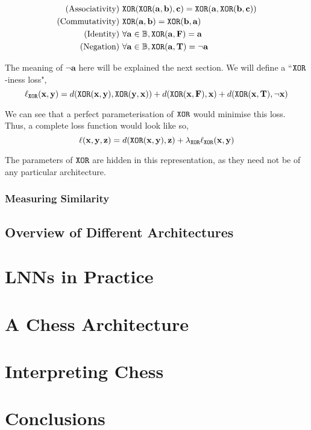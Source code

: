 \documentclass[conference]{report}
\begin{document}
$$
\begin{aligned}
\text{(Associativity)}&\ \texttt{XOR}(\texttt{XOR}(\mathbf{a, b}), \mathbf{c}) = \texttt{XOR}(\mathbf{a}, \texttt{XOR}(\mathbf{b, c})) \\
\text{(Commutativity)}&\ \texttt{XOR}(\mathbf{a, b}) = \texttt{XOR}(\mathbf{b, a}) \\
\text{(Identity)}&\ \forall \mathbf{a} \in \mathbb{B}, \texttt{XOR}(\mathbf{a}, \textbf{F}) = \mathbf{a} \\
\text{(Negation)}&\ \forall \mathbf{a} \in \mathbb{B}, \texttt{XOR}(\mathbf{a}, \textbf{T}) = \lnot \mathbf{a}
\end{aligned}
$$

The meaning of $\lnot\mathbf{a}$ here will be explained the next section. We will define a ``$\texttt{XOR}$-iness loss",
$$\ell_{\texttt{XOR}}(\mathbf{x,y}) = d(\texttt{XOR}(\mathbf{x, y}),\texttt{XOR}(\mathbf{y, x})) + d(\texttt{XOR}(\mathbf{x}, \textbf{F}), \mathbf{x}) + d(\texttt{XOR}(\mathbf{x}, \textbf{T}), \lnot \mathbf{x})$$

We can see that a perfect parameterisation of $\texttt{XOR}$ would minimise this loss. Thus, a complete loss function would look like so,
$$\ell(\mathbf{x,y,z}) = d(\texttt{XOR}(\mathbf{x,y}),\mathbf{z}) + \lambda_{\texttt{XOR}} \ell_{\texttt{XOR}}(\mathbf{x,y})$$

The parameters of $\texttt{XOR}$ are hidden in this representation, as they need not be of any particular architecture.

\subsection{Measuring Similarity}
 
\section{Overview of Different Architectures}
 
\chapter{LNNs in Practice} 

\chapter{A Chess Architecture}

\chapter{Interpreting Chess}

\chapter{Conclusions}
 
\end{document}
